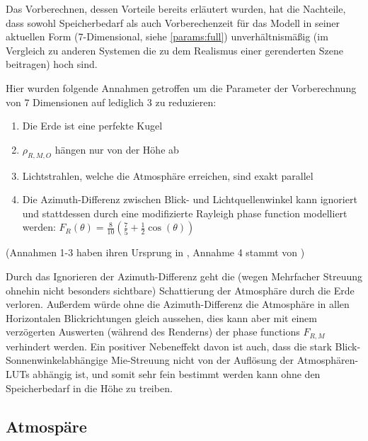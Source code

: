Das Vorberechnen, dessen Vorteile bereits erläutert wurden, hat die Nachteile, dass sowohl Speicherbedarf als auch
Vorberechenzeit für das Modell in seiner aktuellen Form (7-Dimensional, siehe \cref{params:full})
unverhältnismäßig (im Vergleich zu anderen Systemen die zu dem Realismus einer gerenderten Szene beitragen) hoch sind.

Hier wurden folgende Annahmen getroffen um die Parameter der Vorberechnung von 7 Dimensionen auf lediglich 3 zu reduzieren:

\begin{enumerate}
	\item Die Erde ist eine perfekte Kugel
	\item $\rho_{R,M,O}$ hängen nur von der Höhe ab
	\item Lichtstrahlen, welche die Atmosphäre erreichen, sind exakt parallel
	\item Die Azimuth-Differenz zwischen Blick- und Lichtquellenwinkel kann ignoriert und stattdessen durch eine
	modifizierte Rayleigh phase function modelliert werden: $F_R(\theta) = \frac{8}{10}(\frac{7}{5}+\frac{1}{2}\cos(\theta))$
\end{enumerate}

(Annahmen 1-3 haben ihren Ursprung in \cite{Bruneton08}, Annahme 4 stammt von \cite{Elek09})

Durch das Ignorieren der Azimuth-Differenz geht die (wegen Mehrfacher Streuung ohnehin nicht besonders sichtbare)
Schattierung der Atmosphäre durch die Erde verloren. Außerdem würde ohne die Azimuth-Differenz die Atmosphäre in allen
Horizontalen Blickrichtungen gleich aussehen, dies kann aber mit einem verzögerten Auswerten (während des Renderns) der
phase functions $F_{R,M}$ verhindert werden. Ein positiver Nebeneffekt davon ist auch, dass die stark
Blick-Sonnenwinkelabhängige Mie-Streuung nicht von der Auflösung der Atmosphären-LUTs abhängig ist, und somit sehr fein
bestimmt werden kann ohne den Speicherbedarf in die Höhe zu treiben.


\subsection{Atmospäre}

